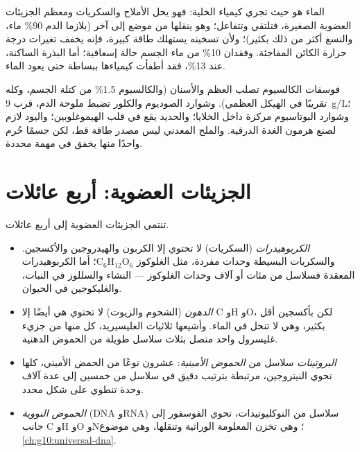 \begin{proposition}\label{prop:g10:chemistry-of-life:water-roles}
الماء هو حيث تجري كيمياء الخلية: فهو يحل الأملاح والسكريات ومعظم
الجزيئات العضوية الصغيرة، فتلتقي وتتفاعل؛ وهو ينقلها من موضع إلى آخر
(بلازما الدم 90\% ماء، والنسغ أكثر من ذلك بكثير)؛ ولأن تسخينه يستهلك
طاقة كبيرة، فإنه يخفف تغيرات درجة حرارة الكائن المفاجئة. وفقدان 10\%
من ماء الجسم حالة إسعافية؛ أما البذرة الساكنة، عند 13\%، فقد أطفأت
كيمياءها ببساطة حتى يعود الماء.
\end{proposition}
\admitted

\begin{example}\label{ex:g10:chemistry-of-life:salts}
فوسفات الكالسيوم تصلب العظم والأسنان (والكالسيوم 1.5\% من كتلة الجسم،
وكله تقريبًا في الهيكل العظمي). وشوارد الصوديوم والكلور تضبط ملوحة
الدم، قرب \qty{9}{g/L}؛ وشوارد البوتاسيوم مركزة داخل الخلايا؛ والحديد
يقع في قلب الهيموغلوبين؛ واليود لازم لصنع هرمون الغدة الدرقية. والملح
المعدني ليس مصدر طاقة قط، لكن جسمًا حُرم واحدًا منها يخفق في مهمة
محددة.
\end{example}

\section{الجزيئات العضوية: أربع عائلات}

\begin{definition}\label{def:g10:chemistry-of-life:families}
تنتمي الجزيئات العضوية إلى أربع عائلات.
\begin{itemize}
  \item \emph{الكربوهيدرات} (السكريات) لا تحتوي
        إلا الكربون والهيدروجين والأكسجين. والسكريات البسيطة وحدات
        مفردة، مثل الغلوكوز $\mathrm{C_6H_{12}O_6}$؛ أما
        الكربوهيدرات المعقدة فسلاسل من مئات أو آلاف وحدات الغلوكوز
        --- النشاء والسللوز في النبات، والغليكوجين في الحيوان.
  \item \emph{الدهون} (الشحوم والزيوت) لا تحتوي هي أيضًا
        إلا C وH وO، لكن بأكسجين أقل بكثير، وهي لا تنحل في الماء.
        وأشيعها ثلاثيات الغليسيريد، كل منها من جزيء غليسرول واحد
        متصل بثلاث سلاسل طويلة من الحموض الدهنية.
  \item \emph{البروتينات} سلاسل من \emph{الحموض
        الأمينية}: عشرون نوعًا من الحمض الأميني،
        كلها تحوي النيتروجين، مرتبطة بترتيب دقيق في سلاسل من خمسين
        إلى عدة آلاف وحدة تنطوي على شكل محدد.
  \item \emph{الحموض النووية} (DNA وRNA) سلاسل من
        النوكليوتيدات، تحوي الفوسفور إلى جانب C وH وO وN؛ وهي تخزن
        المعلومة الوراثية وتنقلها، وهي موضوع
        \cref{ch:g10:universal-dna}.
\end{itemize}
\end{definition}

